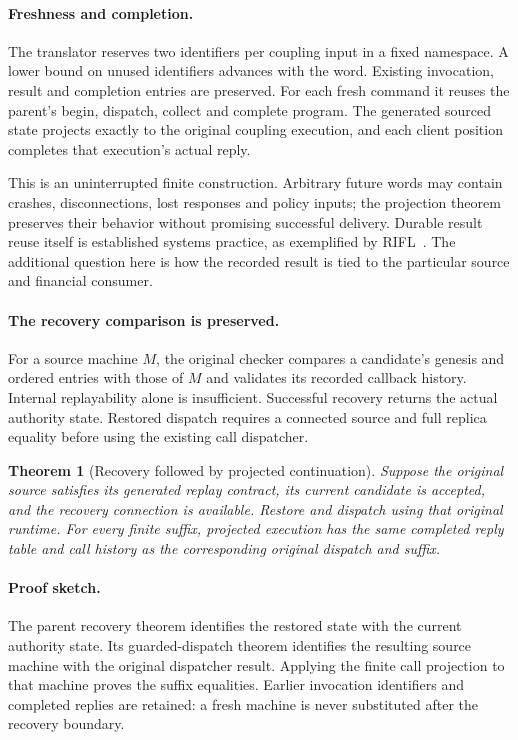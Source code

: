 \documentclass[10pt,a4paper]{article}
\newtheorem{theorem}{Theorem}
\begin{document}
\paragraph{Freshness and completion.}
The translator reserves two identifiers per coupling input in a fixed
namespace. A lower bound on unused identifiers advances with the word.
Existing invocation, result and completion entries are preserved. For each
fresh command it reuses the parent's begin, dispatch, collect and complete
program. The generated sourced state projects exactly to the original coupling
execution, and each client position completes that execution's actual reply.

This is an uninterrupted finite construction. Arbitrary future words may
contain crashes, disconnections, lost responses and policy inputs; the
projection theorem preserves their behavior without promising successful
delivery. Durable result reuse itself is established systems practice, as
exemplified by RIFL~\cite{leeEtAl2015}. The additional question here is how the
recorded result is tied to the particular source and financial consumer.

\paragraph{The recovery comparison is preserved.}
For a source machine $M$, the original checker compares a candidate's genesis
and ordered entries with those of $M$ and validates its recorded callback
history. Internal replayability alone is insufficient. Successful recovery
returns the actual authority state. Restored dispatch requires a connected
source and full replica equality before using the existing call dispatcher.

\begin{theorem}[Recovery followed by projected continuation]
Suppose the original source satisfies its generated replay contract, its
current candidate is accepted, and the recovery connection is available.
Restore and dispatch using that original
runtime. For every finite suffix, projected execution has the same completed
reply table and call history as the corresponding original dispatch and suffix.
\end{theorem}

\paragraph{Proof sketch.}
The parent recovery theorem identifies the restored state with the current
authority state. Its guarded-dispatch theorem identifies the resulting source
machine with the original dispatcher result. Applying the finite call
projection to that machine proves the suffix equalities. Earlier invocation
identifiers and completed replies are retained: a fresh machine is never
substituted after the recovery boundary.
\end{document}
